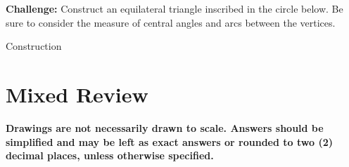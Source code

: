 \begin{exercises}
	\newpage
	
	\begin{ex}  \textbf{Challenge:  }  Construct an equilateral triangle inscribed in the circle below.  Be sure to consider the measure of central angles and arcs between the vertices.\\
	\begin{center}
	\end{center}
	\begin{sol}
	Construction
	\end{sol}
	\end{ex}
	
\end{exercises}	

			\section{Mixed Review}

\noindent \textbf{Drawings are not necessarily drawn to scale.  Answers should be simplified and may be left as exact answers or rounded to two (2) decimal places, unless otherwise specified.}

